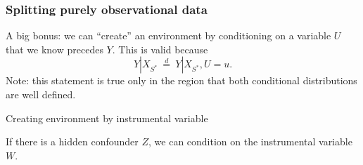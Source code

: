 \documentclass{beamer}
\begin{document}
\begin{frame}
  \frametitle{Splitting purely observational data}
  A big bonus: we can ``create'' an environment by conditioning on a
  variable $U$ that we know precedes $Y$. This is valid because
\[
Y|X_{S^{*}} ~\overset{d}{=}~ Y|X_{S^{*}},U=u.
\]
  Note: this statement is true only in the region that both
  conditional distributions are well defined.

  \begin{exampleblock}{Creating environment by instrumental variable}
    \begin{center}
    \end{center}
    If there is a hidden confounder $Z$, we can condition on the
    instrumental variable $W$.
  \end{exampleblock}
\end{frame}
\end{document}
